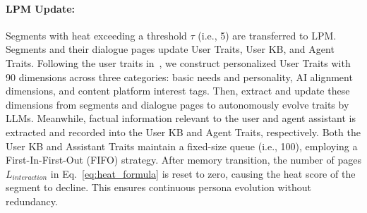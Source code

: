 \documentclass[11pt]{article}
\begin{document}
\paragraph{LPM Update:}
Segments with heat exceeding a threshold $\tau$ (i.e., 5) are transferred to LPM. Segments and their dialogue pages update User Traits, User KB, and Agent Traits.
Following the user traits in~\cite{mayipersona}, we construct personalized User Traits with 90 dimensions across three categories: basic needs and personality, AI alignment dimensions, and content platform interest tags. 
Then, extract and update these dimensions from segments and dialogue pages to autonomously evolve traits by LLMs.
Meanwhile, factual information relevant to the user and agent assistant is extracted and recorded into the User KB and Agent Traits, respectively. 
Both the User KB and Assistant Traits maintain a fixed-size queue (i.e., 100), employing a First-In-First-Out (FIFO) strategy. 
After memory transition, the number of pages $L_{interaction}$ in Eq.~\ref{eq:heat_formula} is reset to zero, causing the heat score of the segment to decline. This ensures continuous persona evolution without redundancy.


    


\end{document}
